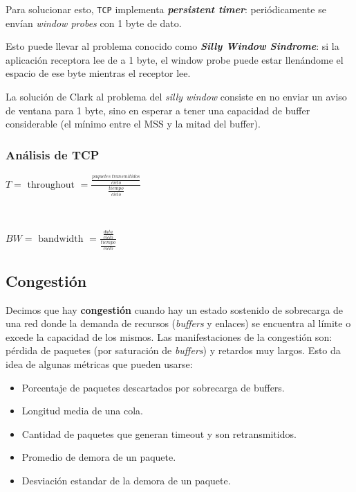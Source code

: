 \documentclass[]{article}
\begin{document}
Para solucionar esto, \texttt{TCP} implementa \textbf{\emph{persistent timer}}: periódicamente se envían \emph{window probes} con 1 byte de dato.

Esto puede llevar al problema conocido como \emph{\textbf{Silly Window Sindrome}}: si la aplicación receptora lee de a 1 byte, el window probe puede estar llenándome el espacio de ese byte mientras el receptor lee.



La solución de Clark al problema del \emph{silly window} consiste en no enviar un aviso de ventana para 1 byte, sino en esperar a tener una capacidad de buffer considerable (el mínimo entre el MSS y la mitad del buffer).

\subsubsection{Análisis de TCP}
\begin{center}
    $\displaystyle T = \text{ throughout } = \frac{\displaystyle \frac{paquetes\ transmitidos}{ciclo}}{\displaystyle \frac{tiempo}{ciclo}}$
\end{center}

~\newline

\begin{center}
    $\displaystyle BW = \text{ bandwidth } = \frac{\displaystyle \frac{data}{ciclo}}{\displaystyle \frac{tiempo}{ciclo}}$
\end{center}

\subsection{Congestión}
Decimos que hay \textbf{congestión} cuando hay un estado sostenido de sobrecarga de una red donde la demanda de recursos (\emph{buffers} y enlaces) se encuentra al límite o excede la capacidad de los mismos. Las manifestaciones de la congestión son: pérdida de paquetes (por saturación de \emph{buffers}) y retardos muy largos. Esto da idea de algunas métricas que pueden usarse:
\begin{itemize}
    \item Porcentaje de paquetes descartados por sobrecarga de buffers.
    \item Longitud media de una cola.
    \item Cantidad de paquetes que generan timeout y son retransmitidos.
    \item Promedio de demora de un paquete.
    \item Desviación estandar de la demora de un paquete.
\end{itemize}
\end{document}
